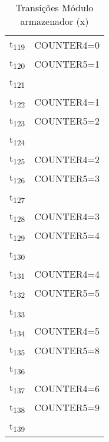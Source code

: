 \begin{table}[htbp]
\caption{Transições Módulo armazenador (x)}
\centering
\begin{tabular}{ll}
t\textsubscript{119} & COUNTER4=0\\
t\textsubscript{120} & COUNTER5=1\\
t\textsubscript{121} & \\
t\textsubscript{122} & COUNTER4=1\\
t\textsubscript{123} & COUNTER5=2\\
t\textsubscript{124} & \\
t\textsubscript{125} & COUNTER4=2\\
t\textsubscript{126} & COUNTER5=3\\
t\textsubscript{127} & \\
t\textsubscript{128} & COUNTER4=3\\
t\textsubscript{129} & COUNTER5=4\\
t\textsubscript{130} & \\
t\textsubscript{131} & COUNTER4=4\\
t\textsubscript{132} & COUNTER5=5\\
t\textsubscript{133} & \\
t\textsubscript{134} & COUNTER4=5\\
t\textsubscript{135} & COUNTER5=8\\
t\textsubscript{136} & \\
t\textsubscript{137} & COUNTER4=6\\
t\textsubscript{138} & COUNTER5=9\\
t\textsubscript{139} & \\
\end{tabular}
\end{table}
